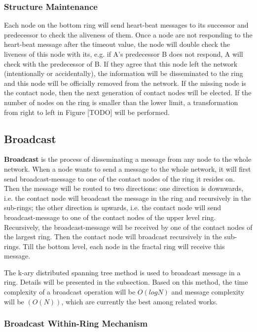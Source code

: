\subsubsection{Structure Maintenance} \label{maintain}

Each node on the bottom ring will send heart-beat messages to its successor and predecessor to check the aliveness of them. Once a node are not responding to the heart-beat message after the timeout value, the node will double check the liveness of this node with its, e.g. if A's predecessor B does not respond, A will check with the predecessor of B. If they agree that this node left the network (intentionally or accidentally), the information will be disseminated to the ring and this node will be officially removed from the network. If the missing node is the contact node, then the next generation of contact nodes will be elected. If the number of nodes on the ring is smaller than the lower limit, a transformation from right to left in Figure [TODO] will be performed.

\subsection{Broadcast} \label{broadcast}

\textbf{Broadcast} is the process of disseminating a message from any node to the whole network. When a node wants to send a message to the whole network, it will first send broadcast-message to one of the contact nodes of the ring it resides on. Then the message will be routed to two directions: one direction is downwards, i.e. the contact node will broadcast the message in the ring and recursively in the sub-rings; the other direction is upwards, i.e. the contact node will send broadcast-message to one of the contact nodes of the upper level ring. Recursively, the broadcast-message will be received by one of the contact nodes of the largest ring. Then the contact node will broadcast recursively in the sub-rings. Till the bottom level, each node in the fractal ring will receive this message.

The k-ary distributed spanning tree method \cite{el2003efficient} is used to broadcast message in a ring. Details will be presented in the subsection. Based on this method, the time complexity of a broadcast operation will be $O(logN)$ and message complexity will be $(O(N))$, which are currently the best among related works.

\subsubsection{Broadcast Within-Ring Mechanism}

